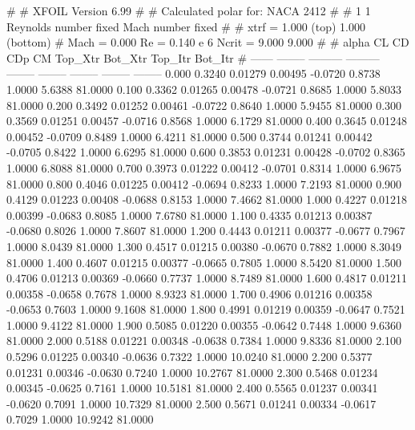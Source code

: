 #  
#       XFOIL         Version 6.99
#  
# Calculated polar for: NACA 2412                                       
#  
# 1 1 Reynolds number fixed          Mach number fixed         
#  
# xtrf =   1.000 (top)        1.000 (bottom)  
# Mach =   0.000     Re =     0.140 e 6     Ncrit =   9.000  9.000
#  
#   alpha    CL        CD       CDp       CM     Top_Xtr  Bot_Xtr  Top_Itr  Bot_Itr
#  ------ -------- --------- --------- -------- -------- -------- -------- --------
   0.000   0.3240   0.01279   0.00495  -0.0720   0.8738   1.0000   5.6388  81.0000
   0.100   0.3362   0.01265   0.00478  -0.0721   0.8685   1.0000   5.8033  81.0000
   0.200   0.3492   0.01252   0.00461  -0.0722   0.8640   1.0000   5.9455  81.0000
   0.300   0.3569   0.01251   0.00457  -0.0716   0.8568   1.0000   6.1729  81.0000
   0.400   0.3645   0.01248   0.00452  -0.0709   0.8489   1.0000   6.4211  81.0000
   0.500   0.3744   0.01241   0.00442  -0.0705   0.8422   1.0000   6.6295  81.0000
   0.600   0.3853   0.01231   0.00428  -0.0702   0.8365   1.0000   6.8088  81.0000
   0.700   0.3973   0.01222   0.00412  -0.0701   0.8314   1.0000   6.9675  81.0000
   0.800   0.4046   0.01225   0.00412  -0.0694   0.8233   1.0000   7.2193  81.0000
   0.900   0.4129   0.01223   0.00408  -0.0688   0.8153   1.0000   7.4662  81.0000
   1.000   0.4227   0.01218   0.00399  -0.0683   0.8085   1.0000   7.6780  81.0000
   1.100   0.4335   0.01213   0.00387  -0.0680   0.8026   1.0000   7.8607  81.0000
   1.200   0.4443   0.01211   0.00377  -0.0677   0.7967   1.0000   8.0439  81.0000
   1.300   0.4517   0.01215   0.00380  -0.0670   0.7882   1.0000   8.3049  81.0000
   1.400   0.4607   0.01215   0.00377  -0.0665   0.7805   1.0000   8.5420  81.0000
   1.500   0.4706   0.01213   0.00369  -0.0660   0.7737   1.0000   8.7489  81.0000
   1.600   0.4817   0.01211   0.00358  -0.0658   0.7678   1.0000   8.9323  81.0000
   1.700   0.4906   0.01216   0.00358  -0.0653   0.7603   1.0000   9.1608  81.0000
   1.800   0.4991   0.01219   0.00359  -0.0647   0.7521   1.0000   9.4122  81.0000
   1.900   0.5085   0.01220   0.00355  -0.0642   0.7448   1.0000   9.6360  81.0000
   2.000   0.5188   0.01221   0.00348  -0.0638   0.7384   1.0000   9.8336  81.0000
   2.100   0.5296   0.01225   0.00340  -0.0636   0.7322   1.0000  10.0240  81.0000
   2.200   0.5377   0.01231   0.00346  -0.0630   0.7240   1.0000  10.2767  81.0000
   2.300   0.5468   0.01234   0.00345  -0.0625   0.7161   1.0000  10.5181  81.0000
   2.400   0.5565   0.01237   0.00341  -0.0620   0.7091   1.0000  10.7329  81.0000
   2.500   0.5671   0.01241   0.00334  -0.0617   0.7029   1.0000  10.9242  81.0000
